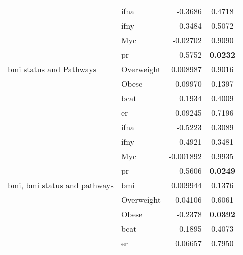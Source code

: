 \begin{table}[htpb]
\begin{threeparttable}
\begin{tabular}{llrc}
                                                                           & \gls{ifna} & -0.3686   & 0.4718 \\
                                                                           & \gls{ifny} & 0.3484    & 0.5072 \\
                                                                           & Myc        & -0.02702  & 0.9090 \\
                                                                           & \gls{pr}   & 0.5752    & \bfseries 0.0232  \\
				\hline
				\rule{0pt}{2.25ex}\gls{bmi} status and Pathways            & Overweight & 0.008987  & 0.9016 \\
                                                                           & Obese      & -0.09970  & 0.1397 \\
                                                                           & \gls{bcat} & 0.1934    & 0.4009 \\
                                                                           & \gls{er}   & 0.09245   & 0.7196 \\
                                                                           & \gls{ifna} & -0.5223   & 0.3089 \\
                                                                           & \gls{ifny} & 0.4921    & 0.3481 \\
                                                                           & Myc        & -0.001892 & 0.9935 \\
                                                                           & \gls{pr}   & 0.5606    & \bfseries 0.0249  \\
				\hline
				\rule{0pt}{2.25ex}\gls{bmi}, \gls{bmi} status and pathways & \gls{bmi}  & 0.009944  & 0.1376 \\
                                                                           & Overweight & -0.04106  & 0.6061 \\
                                                                           & Obese      & -0.2378   & \bfseries 0.0392  \\
                                                                           & \gls{bcat} & 0.1895    & 0.4073 \\
                                                                           & \gls{er}   & 0.06657   & 0.7950 \\

\end{tabular}
\end{threeparttable}
\end{table}
